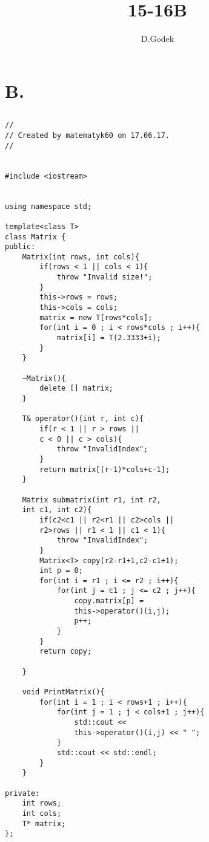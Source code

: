 \documentclass{article}
\begin{document}
\title{15-16B}
\author{D.Godek}
{\scriptsize}
\section{B.}

\subsection{}
\begin{multicols}{2}
\begin{verbatim}
//
// Created by matematyk60 on 17.06.17.
//


#include <iostream>


using namespace std;

template<class T>
class Matrix {
public:
    Matrix(int rows, int cols){
        if(rows < 1 || cols < 1){
            throw "Invalid size!";
        }
        this->rows = rows;
        this->cols = cols;
        matrix = new T[rows*cols];
        for(int i = 0 ; i < rows*cols ; i++){
            matrix[i] = T(2.3333+i);
        }
    }
    
    ~Matrix(){
        delete [] matrix;
    }

    T& operator()(int r, int c){
        if(r < 1 || r > rows ||
        c < 0 || c > cols){
            throw "InvalidIndex";
        }
        return matrix[(r-1)*cols+c-1];
    }
    
    Matrix submatrix(int r1, int r2,
    int c1, int c2){
        if(c2<c1 || r2<r1 || c2>cols || 
        r2>rows || r1 < 1 || c1 < 1){
            throw "InvalidIndex";
        }
        Matrix<T> copy(r2-r1+1,c2-c1+1);
        int p = 0;
        for(int i = r1 ; i <= r2 ; i++){
            for(int j = c1 ; j <= c2 ; j++){
                copy.matrix[p] =
                this->operator()(i,j);
                p++;
            }
        }
        return copy;

    }

    void PrintMatrix(){
        for(int i = 1 ; i < rows+1 ; i++){
            for(int j = 1 ; j < cols+1 ; j++){
                std::cout << 
                this->operator()(i,j) << " ";
            }
            std::cout << std::endl;
        }
    }
    
private:
    int rows;
    int cols;
    T* matrix;
};
\end{verbatim}
\end{multicols}

\newpage
\end{document}

